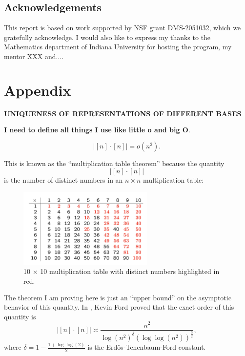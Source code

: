 \documentclass[12pt]{amsart}
\begin{document}
\subsection*{Acknowledgements} %
This report is based on work supported by NSF grant DMS-2051032, which we gratefully acknowledge. I would also like to express my thanks to the Mathematics department of Indiana University for hosting the program, my mentor XXX and....




\section*{Appendix}

\textbf{UNIQUENESS OF REPRESENTATIONS OF DIFFERENT BASES}

\textbf{I need to define all things I use like little o and big O}.

\begin{theorem*}
\[
    \left\lvert [n] \cdot [n] \right\rvert = o(n^{2})
.\]
\end{theorem*}

This is known as the ``multiplication table theorem'' because the quantity
\[
    \left\lvert [n] \cdot [n] \right\rvert 
\]
is the number of distinct numbers in an \(n \times n\) multiplication table:

\begin{figure}[h]
    \centering
    \includegraphics[width=0.6\textwidth]{mult-table.png}
    \caption{10 \(\times \) 10 multiplication table with distinct numbers highlighted in red.}
\end{figure}

The theorem I am proving here is just an ``upper bound'' on the asymptotic behavior of
this quantity. In \cite{Ford}, Kevin Ford proved that the exact order of this quantity is
\[
    \left\lvert [n] \cdot [n] \right\rvert \asymp \frac{n^{2}}{\log \left( n^{2} \right) ^{\delta} \left( \log \log \left( n^{2} \right) \right) ^{\frac{3}{2} } } 
,\]
where \(\delta = 1 - \frac{1 + \log \log \left( 2 \right)  }{2} \) is the Erd\H{o}s-Tenenbaum-Ford constant.
\end{document}
